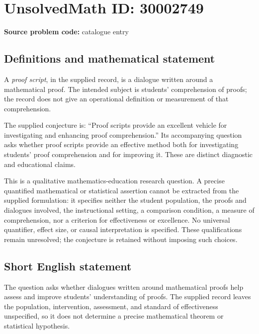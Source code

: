 \documentclass[11pt]{article}
\begin{document}
\section*{UnsolvedMath ID: 30002749}
\textbf{Source problem code:} catalogue entry
\subsection{Definitions and mathematical statement}
A \emph{proof script}, in the supplied record, is a dialogue written around a mathematical proof. The intended subject is students' comprehension of proofs; the record does not give an operational definition or measurement of that comprehension.

The supplied conjecture is: ``Proof scripts provide an excellent vehicle for investigating and enhancing proof comprehension.'' Its accompanying question asks whether proof scripts provide an effective method both for investigating students' proof comprehension and for improving it. These are distinct diagnostic and educational claims.

This is a qualitative mathematics-education research question. A precise quantified mathematical or statistical assertion cannot be extracted from the supplied formulation: it specifies neither the student population, the proofs and dialogues involved, the instructional setting, a comparison condition, a measure of comprehension, nor a criterion for effectiveness or excellence. No universal quantifier, effect size, or causal interpretation is specified. These qualifications remain unresolved; the conjecture is retained without imposing such choices.
\subsection{Short English statement}
The question asks whether dialogues written around mathematical proofs help assess and improve students' understanding of proofs. The supplied record leaves the population, intervention, assessment, and standard of effectiveness unspecified, so it does not determine a precise mathematical theorem or statistical hypothesis.
\end{document}
